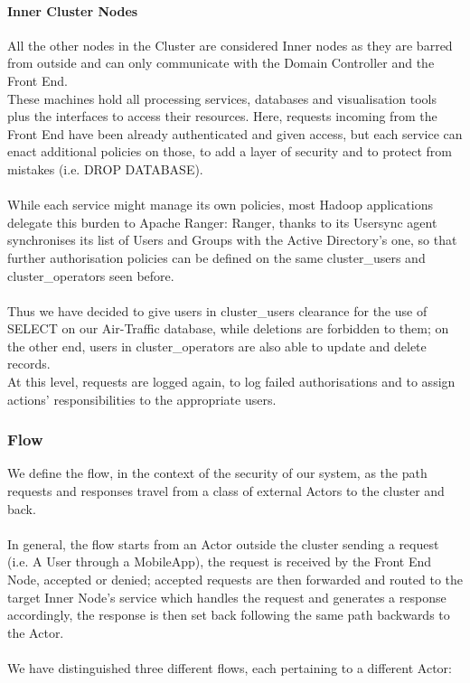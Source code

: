 \paragraph{Inner Cluster Nodes}

All the other nodes in the Cluster are considered Inner nodes as they are barred from outside and can only communicate with the Domain Controller and the Front End. \\
These machines hold all processing services, databases and visualisation tools plus the interfaces to access their resources. Here, requests incoming from the Front End have been already authenticated and given access, but each service can enact additional policies on those, to add a layer of security and to protect from mistakes (i.e. DROP DATABASE). \\ \\
While each service might manage its own policies, most Hadoop applications delegate this burden to Apache Ranger: Ranger, thanks to its Usersync agent synchronises its list of Users and Groups with the Active Directory's one, so that further authorisation policies can be defined on the same cluster\_users and cluster\_operators seen before. \\ \\
 Thus we have decided to give users in cluster\_users clearance for the use of SELECT on our Air-Traffic database, while deletions are forbidden to them; on the other end, users in cluster\_operators are also able to update and delete records.
\\ At this level, requests are logged again, to log failed authorisations and to assign actions' responsibilities to the appropriate users.

\subsubsection{Flow}
We define the flow, in the context of the security of our system, as the path requests and responses travel from a class of external Actors to the cluster and back.
\\ \\
In general, the flow starts from an Actor outside the cluster sending a request (i.e. A User through a MobileApp), the request is received by the Front End Node, accepted or denied; accepted requests are then forwarded and routed to the target Inner Node's service which handles the request and generates a response accordingly, the response is then set back following the same path backwards to the Actor.
\\ \\
We have distinguished three different flows, each pertaining to a different Actor:
